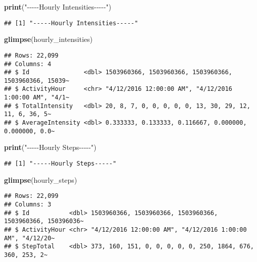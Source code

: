 \documentclass[
]{article}
\newenvironment{Shaded}{\begin{snugshade}}{\end{snugshade}}
\newcommand{\FunctionTok}[1]{\textcolor[rgb]{0.13,0.29,0.53}{\textbf{#1}}}
\newcommand{\NormalTok}[1]{#1}
\newcommand{\StringTok}[1]{\textcolor[rgb]{0.31,0.60,0.02}{#1}}
\begin{document}
\begin{Shaded}
\begin{Highlighting}[]
\FunctionTok{print}\NormalTok{(}\StringTok{"{-}{-}{-}{-}{-}Hourly Intensities{-}{-}{-}{-}{-}"}\NormalTok{)}
\end{Highlighting}
\end{Shaded}

\begin{verbatim}
## [1] "-----Hourly Intensities-----"
\end{verbatim}

\begin{Shaded}
\begin{Highlighting}[]
\FunctionTok{glimpse}\NormalTok{(hourly\_intensities)}
\end{Highlighting}
\end{Shaded}

\begin{verbatim}
## Rows: 22,099
## Columns: 4
## $ Id               <dbl> 1503960366, 1503960366, 1503960366, 1503960366, 15039~
## $ ActivityHour     <chr> "4/12/2016 12:00:00 AM", "4/12/2016 1:00:00 AM", "4/1~
## $ TotalIntensity   <dbl> 20, 8, 7, 0, 0, 0, 0, 0, 13, 30, 29, 12, 11, 6, 36, 5~
## $ AverageIntensity <dbl> 0.333333, 0.133333, 0.116667, 0.000000, 0.000000, 0.0~
\end{verbatim}

\begin{Shaded}
\begin{Highlighting}[]
\FunctionTok{print}\NormalTok{(}\StringTok{"{-}{-}{-}{-}{-}Hourly Steps{-}{-}{-}{-}{-}"}\NormalTok{)}
\end{Highlighting}
\end{Shaded}

\begin{verbatim}
## [1] "-----Hourly Steps-----"
\end{verbatim}

\begin{Shaded}
\begin{Highlighting}[]
\FunctionTok{glimpse}\NormalTok{(hourly\_steps)}
\end{Highlighting}
\end{Shaded}

\begin{verbatim}
## Rows: 22,099
## Columns: 3
## $ Id           <dbl> 1503960366, 1503960366, 1503960366, 1503960366, 150396036~
## $ ActivityHour <chr> "4/12/2016 12:00:00 AM", "4/12/2016 1:00:00 AM", "4/12/20~
## $ StepTotal    <dbl> 373, 160, 151, 0, 0, 0, 0, 0, 250, 1864, 676, 360, 253, 2~
\end{verbatim}
\end{document}

